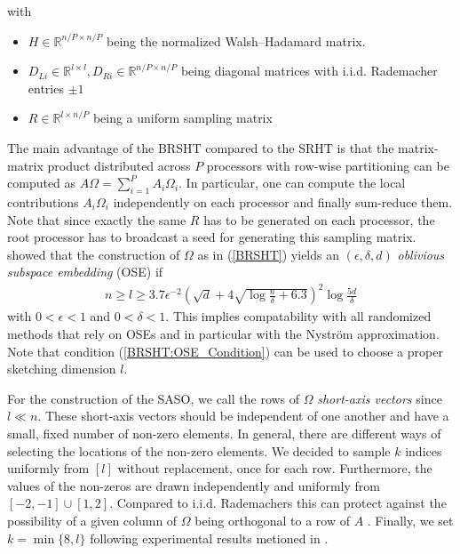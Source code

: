 \documentclass{article}
\theoremstyle{definition}
\begin{document}
with 
\begin{itemize}
    \item $H\in \mathbb{R}^{n/P \times n/P}$ being the normalized Walsh–Hadamard matrix.
    \item $D_{L i}\in \mathbb{R}^{l \times l}, D_{R i}\in \mathbb{R}^{n/P \times n/P}$ being diagonal matrices with i.i.d. Rademacher entries $\pm 1$
    \item $R\in \mathbb{R}^{l \times n/P}$ being a  uniform sampling matrix
\end{itemize}
The main advantage of the BRSHT compared to the SRHT is that the matrix-matrix product distributed across $P$ processors with row-wise partitioning can be computed as $A\Omega = \sum_{i=1}^P A_i \Omega_i$. In particular, one can compute the local contributions $A_i \Omega_i$ independently on each processor and finally sum-reduce them. Note that since exactly the same $R$ has to be generated on each processor, the root processor has to broadcast a seed for generating this sampling matrix. \citeauthor{balabanov2022} \cite{balabanov2022} showed that the construction of $\Omega$ as in (\ref{BRSHT}) yields an $(\epsilon, \delta, d)$ \textit{oblivious subspace embedding} (OSE) if
\begin{align}
    \label{BRSHT:OSE_Condition}
    n \geq l \geq 3.7 \epsilon^{-2} 
    \left( 
        \sqrt{d} + 4 \sqrt{\log \frac{n}{\delta} + 6.3}
    \right)^2
    \log \frac{5d}{\delta}
\end{align}
with $0 < \epsilon < 1$ and $0 < \delta < 1$. This implies compatability with all randomized methods that rely on OSEs and in particular with the Nyström approximation. Note that condition (\ref{BRSHT:OSE_Condition}) can be used to choose a proper sketching dimension $l$.

For the construction of the SASO, we call the rows of $\Omega$ \textit{short-axis vectors} since $l \ll n$. These short-axis vectors should be independent of one another and have a small, fixed number of non-zero elements. In general, there are different ways of selecting the locations of the non-zero elements. We decided to sample $k$ indices uniformly from $[l]$ without replacement, once for each row. Furthermore, the values of the non-zeros are drawn independently and uniformly from $[-2,-1] \cup [1, 2]$. Compared to i.i.d. Rademachers this can protect against the possibility of a given column of $\Omega$ being orthogonal to a row of $A$ \cite{murray2023}. Finally, we set $k = \min\{8, l\}$ following experimental results metioned in \cite{murray2023}.
\end{document}

